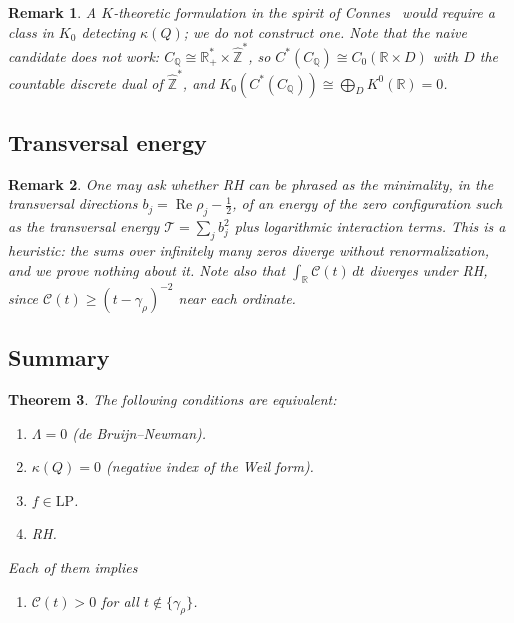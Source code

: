 \documentclass[11pt]{amsart}
\newtheorem{theorem}{Theorem}[section]
\newtheorem{remark}[theorem]{Remark}
\renewcommand{\Re}{\operatorname{Re}}
\newcommand{\LP}{\mathrm{LP}}
\begin{document}
\begin{remark}\label{rem:ktheory}
A $K$-theoretic formulation in the spirit of Connes~\cite{Connes1999} would require a class
in $K_0$ detecting $\kappa(Q)$; we do not construct one. Note that the naive candidate does
not work: $C_\mathbb{Q}\cong\mathbb R_+^*\times\hat{\mathbb Z}^*$, so
$C^*(C_\mathbb Q)\cong C_0(\mathbb R\times D)$ with $D$ the countable discrete dual of
$\hat{\mathbb Z}^*$, and $K_0(C^*(C_\mathbb Q))\cong\bigoplus_D K^0(\mathbb R)=0$.
\end{remark}

\subsection{Transversal energy}

\begin{remark}\label{rem:energy}
One may ask whether RH can be phrased as the minimality, in the transversal directions
$b_j=\Re\rho_j-\tfrac12$, of an energy of the zero configuration such as the transversal
energy $\mathcal T=\sum_j b_j^2$ plus logarithmic interaction terms. This is a heuristic: the
sums over infinitely many zeros diverge without renormalization, and we prove nothing about
it. Note also that $\int_{\mathbb R}\mathcal C(t)\,dt$ diverges under RH, since
$\mathcal C(t)\ge(t-\gamma_\rho)^{-2}$ near each ordinate.
\end{remark}

\subsection{Summary}

\begin{theorem}\label{thm:lp}
The following conditions are equivalent:
\begin{enumerate}
  \item[\rm(A)] $\Lambda = 0$ (de Bruijn--Newman).
  \item[\rm(B)] $\kappa(Q) = 0$ (negative index of the Weil form).
  \item[\rm(E)] $f \in \LP$.
  \item[\rm(F)] RH.
\end{enumerate}
Each of them implies
\begin{enumerate}
  \item[\rm(D)] $\mathcal{C}(t) > 0$ for all $t \notin \{\gamma_\rho\}$.
\end{enumerate}
\end{theorem}
\end{document}
